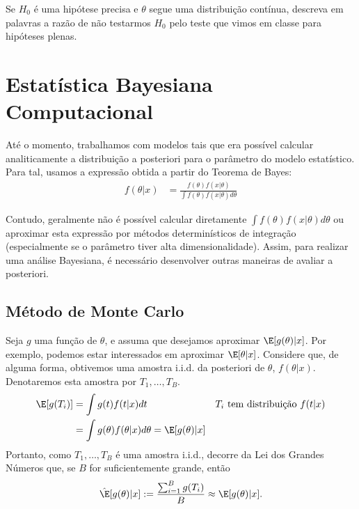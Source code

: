 \begin{exercise}
 Se $H_{0}$ é uma hipótese precisa e
 $\theta$ segue uma distribuição contínua,
 descreva em palavras a razão de não testarmos $H_{0}$
 pelo teste que vimos em classe para hipóteses plenas.
\end{exercise}




\section{Estatística Bayesiana Computacional}

Até o momento, trabalhamos com modelos tais que
era possível calcular analiticamente 
a distribuição a posteriori para o parâmetro do
modelo estatístico. Para tal, usamos a expressão
obtida a partir do Teorema de Bayes:
\begin{align*}
 f(\theta|x)
 &= \frac{f(\theta)f(x|\theta)}
 {\int{f(\theta)f(x|\theta)d\theta}}
\end{align*}

Contudo, geralmente não é possível calcular diretamente
$\int{f(\theta)f(x|\theta)d\theta}$
ou aproximar esta expressão por métodos determinísticos de
integração (especialmente se o parâmetro tiver
alta dimensionalidade). Assim, para
realizar uma análise Bayesiana, é necessário
desenvolver outras maneiras de avaliar a posteriori.

\subsection{Método de Monte Carlo}

Seja $g$ uma função de $\theta$, e assuma que desejamos aproximar
$\E[g(\theta)|x]$. Por exemplo, podemos estar interessados em aproximar
$\E[\theta|x]$.
Considere que, de alguma forma, obtivemos uma
amostra i.i.d. da posteriori de $\theta$, $f(\theta|x)$.
Denotaremos esta amostra por $T_{1},\ldots,T_{B}$.
\begin{align*}
 \E[g(T_{i})]
 &= \int{g(t)f(t|x)dt}
 & \text{$T_{i}$ tem distribuição $f(t|x)$} \\
 &= \int{g(\theta)f(\theta|x)d\theta}
 = \E[g(\theta)|x]
\end{align*}
Portanto, como $T_{1},\ldots,T_{B}$ é uma amostra i.i.d.,
decorre da Lei dos Grandes Números que, se
$B$ for suficientemente grande, então
\begin{align}
 \label{eqn:monte_carlo_1}
 \hat{\E}[g(\theta)|x]
 := \frac{\sum_{i=1}^{B}{g(T_{i})}}{B}
 \approx \E[g(\theta)|x].
\end{align}

